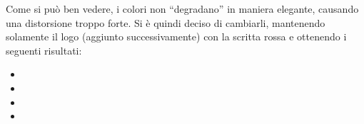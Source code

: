 Come si può ben vedere, i colori non ``degradano'' in maniera elegante, causando una distorsione troppo forte. Si è quindi deciso di cambiarli, mantenendo solamente il logo (aggiunto successivamente) con la scritta rossa e ottenendo i seguenti risultati:
\begin{itemize}


    \item[]

    \item[]

    \item[]

    \item[]

\end{itemize}
